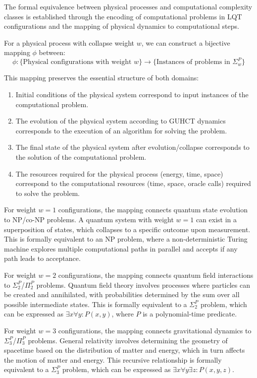 \documentclass[11pt,a4paper]{article}
\makeatletter
\renewenvironment{proof}[1][\proofname]{\par
  \pushQED{\qed}%
  \normalfont \topsep6\p@\@plus6\p@\relax
  \trivlist
  \item[\hskip\labelsep
        \itshape
    #1\@addpunct{.}]\ignorespaces
}{%
  \popQED\endtrivlist\@endpefalse
}
\makeatother
\begin{document}
\begin{proof}
The formal equivalence between physical processes and computational complexity classes is established through the encoding of computational problems in LQT configurations and the mapping of physical dynamics to computational steps.

For a physical process with collapse weight $w$, we can construct a bijective mapping $\phi$ between:
\begin{equation}
\phi: \{\text{Physical configurations with weight } w\} \rightarrow \{\text{Instances of problems in } \Sigma_w^P\}
\end{equation}

This mapping preserves the essential structure of both domains:
\begin{enumerate}
    \item Initial conditions of the physical system correspond to input instances of the computational problem.
    \item The evolution of the physical system according to GUHCT dynamics corresponds to the execution of an algorithm for solving the problem.
    \item The final state of the physical system after evolution/collapse corresponds to the solution of the computational problem.
    \item The resources required for the physical process (energy, time, space) correspond to the computational resources (time, space, oracle calls) required to solve the problem.
\end{enumerate}

For weight $w=1$ configurations, the mapping connects quantum state evolution to NP/co-NP problems. A quantum system with weight $w=1$ can exist in a superposition of states, which collapses to a specific outcome upon measurement. This is formally equivalent to an NP problem, where a non-deterministic Turing machine explores multiple computational paths in parallel and accepts if any path leads to acceptance.

For weight $w=2$ configurations, the mapping connects quantum field interactions to $\Sigma_2^P$/$\Pi_2^P$ problems. Quantum field theory involves processes where particles can be created and annihilated, with probabilities determined by the sum over all possible intermediate states. This is formally equivalent to a $\Sigma_2^P$ problem, which can be expressed as $\exists x \forall y: P(x,y)$, where $P$ is a polynomial-time predicate.

For weight $w=3$ configurations, the mapping connects gravitational dynamics to $\Sigma_3^P$/$\Pi_3^P$ problems. General relativity involves determining the geometry of spacetime based on the distribution of matter and energy, which in turn affects the motion of matter and energy. This recursive relationship is formally equivalent to a $\Sigma_3^P$ problem, which can be expressed as $\exists x \forall y \exists z: P(x,y,z)$.


\end{proof}
\end{document}
